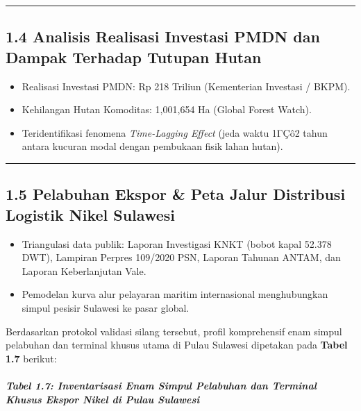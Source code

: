 \documentclass[
]{article}
\providecommand{\tightlist}{%
  \setlength{\itemsep}{0pt}\setlength{\parskip}{0pt}}
\begin{document}
\begin{center}\rule{0.5\linewidth}{0.5pt}\end{center}

\subsection{1.4 Analisis Realisasi Investasi PMDN dan Dampak Terhadap
Tutupan
Hutan}\label{analisis-realisasi-investasi-pmdn-dan-dampak-terhadap-tutupan-hutan}

\begin{itemize}
\tightlist
\item
  Realisasi Investasi PMDN: Rp 218 Triliun (Kementerian Investasi /
  BKPM).
\item
  Kehilangan Hutan Komoditas: 1,001,654 Ha (Global Forest Watch).
\item
  Teridentifikasi fenomena \emph{Time-Lagging Effect} (jeda waktu 1ΓÇô2
  tahun antara kucuran modal dengan pembukaan fisik lahan hutan).
\end{itemize}

\begin{center}\rule{0.5\linewidth}{0.5pt}\end{center}

\subsection{1.5 Pelabuhan Ekspor \& Peta Jalur Distribusi Logistik Nikel
Sulawesi}\label{pelabuhan-ekspor-peta-jalur-distribusi-logistik-nikel-sulawesi}

\begin{itemize}
\tightlist
\item
  Triangulasi data publik: Laporan Investigasi KNKT (bobot kapal 52.378
  DWT), Lampiran Perpres 109/2020 PSN, Laporan Tahunan ANTAM, dan
  Laporan Keberlanjutan Vale.
\item
  Pemodelan kurva alur pelayaran maritim internasional menghubungkan
  simpul pesisir Sulawesi ke pasar global.
\end{itemize}

Berdasarkan protokol validasi silang tersebut, profil komprehensif enam
simpul pelabuhan dan terminal khusus utama di Pulau Sulawesi dipetakan
pada \textbf{Tabel 1.7} berikut:

\subparagraph{Tabel 1.7: Inventarisasi Enam Simpul Pelabuhan dan
Terminal Khusus Ekspor Nikel di Pulau
Sulawesi}\label{tabel-1.7-inventarisasi-enam-simpul-pelabuhan-dan-terminal-khusus-ekspor-nikel-di-pulau-sulawesi}
\end{document}
